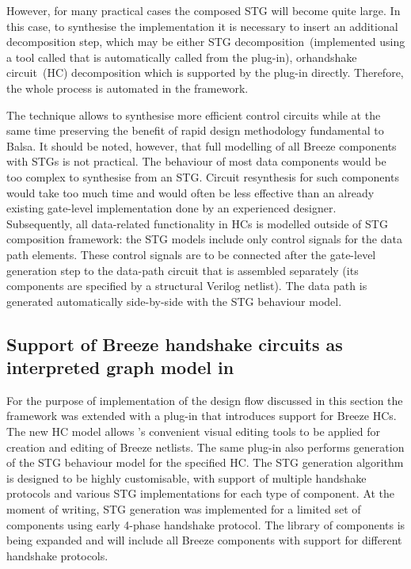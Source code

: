 However, for many practical cases the composed STG will become quite
large. In this case, to synthesise the implementation it is necessary
to insert an additional decomposition step, which may be either STG
decomposition~(implemented using a tool called \cite{DesiJ}
that is automatically called from the plug-in), or\noun{ }handshake
circuit~(HC) decomposition which is supported by the plug-in directly.
Therefore, the whole process is automated in the framework.

The technique allows to synthesise more efficient control circuits
while at the same time preserving the benefit of rapid design methodology
fundamental to Balsa. It should be noted, however, that full modelling
of all Breeze components with STGs is not practical. The behaviour
of most data components would be too complex to synthesise from an
STG. Circuit resynthesis for such components would take too much time
and would often be less effective than an already existing gate-level
implementation done by an experienced designer. Subsequently, all
data-related functionality in HCs is modelled outside of STG composition
framework: the STG models include only control signals for the data
path elements. These control signals are to be connected after the
gate-level generation step to the data-path circuit that is assembled
separately (its components are specified by a structural Verilog netlist).
The data path is generated automatically side-by-side with the STG
behaviour model.


\subsection{Support of Breeze handshake circuits as interpreted graph model in
}

For the purpose of implementation of the design flow discussed in
this section the  framework was extended with a plug-in
that introduces support for Breeze HCs. The new HC model allows 's
convenient visual editing tools to be applied for creation and editing
of Breeze netlists. The same plug-in also performs generation of the
STG behaviour model for the specified HC. The STG generation algorithm
is designed to be highly customisable, with support of multiple handshake
protocols and various STG implementations for each type of component.
At the moment of writing, STG generation was implemented for a limited
set of components using early 4-phase handshake protocol. The library
of components is being expanded and will include all Breeze components
with support for different handshake protocols.


